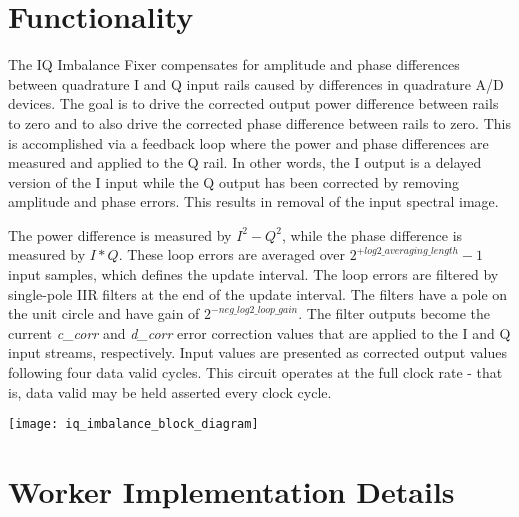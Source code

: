 \documentclass{article}
\begin{document}
\section*{Functionality}
\begin{flushleft}
	The IQ Imbalance Fixer compensates for amplitude and phase differences between quadrature I and Q input rails caused by differences in quadrature A/D devices. The goal is to drive the corrected output power difference between rails to zero and to also drive the corrected phase difference between rails to zero. This is accomplished via a feedback loop where the power and phase differences are measured and applied to the Q rail. In other words, the I output is a delayed version of the I input while the Q output has been corrected by removing amplitude and phase errors. This results in removal of the input spectral image.\medskip

	The power difference is measured by $I^2 - Q^2$, while the phase difference is measured by $I*Q$. These loop errors are averaged over $2^{+log2\_averaging\_length}-1$ input samples, which defines the update interval. The loop errors are filtered by single-pole IIR filters at the end of the update interval. The filters have a pole on the unit circle and have gain of $2^{-neg\_log2\_loop\_gain}$. The filter outputs become the current \textit{c\_corr} and \textit{d\_corr} error correction values that are applied to the I and Q input streams, respectively. Input values are presented as corrected output values following four data valid cycles. This circuit operates at the full clock rate - that is, data valid may be held asserted every clock cycle.\medskip
\end{flushleft}

{\centering\captionsetup{type=figure}\texttt{[image: iq\_imbalance\_block\_diagram]}\par{}\label{fig:iq_imbalance_block_diagram}}
\newpage

\section*{Worker Implementation Details}
\end{document}
